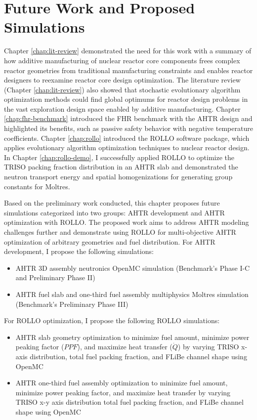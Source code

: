 \chapter{Future Work and Proposed Simulations}

Chapter \ref{chap:lit-review} demonstrated the need for this work with a summary
of how additive manufacturing of nuclear reactor core components frees complex 
reactor geometries from traditional manufacturing constraints and enables 
reactor designers to reexamine reactor core design optimization.
The literature review (Chapter \ref{chap:lit-review}) also showed that 
stochastic evolutionary algorithm optimization methods could find global 
optimums for reactor design problems in the vast exploration design space 
enabled by additive manufacturing. 
Chapter \ref{chap:fhr-benchmark} introduced the \acrfull{FHR} benchmark with 
the \gls{AHTR} design and highlighted its benefits, such as passive safety 
behavior with negative temperature coefficients. 
Chapter \ref{chap:rollo} introduced the \acrfull{ROLLO} software package, 
which applies evolutionary algorithm optimization techniques to nuclear 
reactor design. 
In Chapter \ref{chap:rollo-demo}, I successfully applied \gls{ROLLO} 
to optimize the \gls{TRISO} packing fraction distribution in an \gls{AHTR} slab
and demonstrated the neutron transport energy and spatial homogenizations for 
generating group constants for Moltres. 

Based on the preliminary work conducted, this chapter proposes 
future simulations categorized into two groups: \gls{AHTR} development and 
\gls{AHTR} optimization with \gls{ROLLO}. 
The proposed work aims to address \gls{AHTR} modeling challenges further and 
demonstrate using \gls{ROLLO} for multi-objective \gls{AHTR} 
optimization of arbitrary geometries and fuel distribution. 
For \gls{AHTR} development, I propose the following simulations: 
\begin{itemize}
    \item \gls{AHTR} 3D assembly neutronics OpenMC simulation (Benchmark's Phase I-C and 
    Preliminary Phase II)
    \item \gls{AHTR} fuel slab and one-third fuel assembly multiphysics 
    Moltres simulation (Benchmark's Preliminary Phase III)
\end{itemize}
For \gls{ROLLO} optimization, I propose the following \gls{ROLLO} simulations: 
\begin{itemize}
    \item \gls{AHTR} slab geometry optimization to minimize fuel amount, 
    minimize power peaking factor ($PPF$), and maximize heat transfer ($\dot{Q}$) 
    by varying \gls{TRISO} x-axis distribution, total fuel packing fraction, 
    and \gls{FLiBe} channel shape using OpenMC
    \item \gls{AHTR} one-third fuel assembly optimization to minimize fuel amount, 
    minimize power peaking factor, and maximize heat transfer by varying \gls{TRISO} 
    x-y axis distribution total fuel packing fraction, and \gls{FLiBe} channel 
    shape using OpenMC
\end{itemize}

